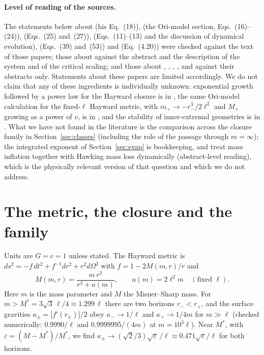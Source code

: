 \documentclass[11pt]{article}
\begin{document}
\paragraph{Level of reading of the sources.} The statements below about \citet{Ori1998} (his Eq.~(18)), \citet{CarballoRubio2021} (the Ori-model section, Eqs.~(16)--(24)), \citet{Bonanno2021} (Eqs.~(25) and~(27)), \citet{EichhornFernandes2025} (Eqs.~(11)--(13) and the discussion of dynamical evolution), \citet{Barcelo2022} (Eqs.~(39) and~(53)) and \citet{FrolovZelnikov2026} (Eq.~(4.20)) were checked against the text of those papers; those about \citet{ShaoEtAl2025} against the abstract and the description of the system and of the critical scaling; and those about \citet{CarballoRubio2022b}, \citet{Bonanno2023}, \citet{KhodadiFirouzjaee2024}, \citet{Lanir2019}, \citet{Dafermos2005} and \citet{VanDeMoortel2020} against their abstracts only. Statements about these papers are limited accordingly.
We do not claim that any of these ingredients is individually unknown: exponential growth followed by a power law for the Hayward closure is in \citet{CarballoRubio2021}, the same Ori-model calculation for the fixed-$\ell$ Hayward metric, with $m_+\to-r_-^3/2\ell^2$ and $M_+$ growing as a power of $v$, is in \citet{Bonanno2021}, and the stability of inner-extremal geometries is in \citet{CarballoRubio2022b}. What we have not found in the literature is the comparison across the closure family in Section~\ref{sec:classes} (including the role of the passage through $m=\infty$); the integrated exponent of Section~\ref{sec:evap} is bookkeeping, and \citet{Bonanno2023} treat mass inflation together with Hawking mass loss dynamically (abstract-level reading), which is the physically relevant version of that question and which we do not address.

\section{The metric, the closure and the family}
\label{sec:setup}

Units are $G=c=1$ unless stated. The Hayward metric is $ds^2=-f\,dt^2+f^{-1}dr^2+r^2d\Omega^2$ with $f=1-2M(m,r)/r$ and
\begin{equation}
M(m,r)=\frac{m\,r^3}{r^3+a(m)},\qquad a(m)=2\ell^2 m \quad(\text{fixed }\ell).
\label{eq:closure}
\end{equation}
Here $m$ is the mass parameter and $M$ the Misner--Sharp mass. For $m>M^*=3\sqrt3\,\ell/4\approx1.299\,\ell$ there are two horizons $r_-<r_+$, and the surface gravities $\kappa_\pm=|f'(r_\pm)|/2$ obey $\kappa_-\to1/\ell$ and $\kappa_+\to1/4m$ for $m\gg\ell$ (checked numerically: $0.9990/\ell$ and $0.9999995/(4m)$ at $m=10^3\ell$). Near $M^*$, with $\varepsilon=(M-M^*)/M^*$, we find $\kappa_\pm\to(\sqrt2/3)\sqrt\varepsilon\,/\ell\approx0.471\sqrt\varepsilon/\ell$ for both horizons.
\end{document}
